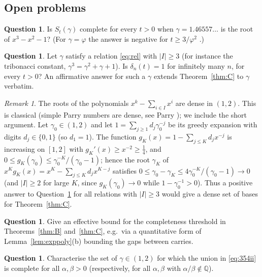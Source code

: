 \documentclass[11pt]{amsart}
\theoremstyle{definition}
\newtheorem{question}[lemma]{Question}
\theoremstyle{remark}
\newtheorem{remark}[lemma]{Remark}
\newcommand{\Q}{\mathbb{Q}}
\begin{document}
\subsection{Open problems}
\begin{question}
Is $S_t(\gamma)$ complete for every $t>0$ when $\gamma=1.46557\ldots$ is the root of
$x^3-x^2-1$? (For $\gamma=\varphi$ the answer is negative for $t\ge3/\varphi^2$ \cite{vD26}.)
\end{question}

\begin{question}\label{q:units}
Let $\gamma$ satisfy a relation \eqref{eq:rel} with $|I|\ge3$ (for instance the tribonacci
constant, $\gamma^3=\gamma^2+\gamma+1$). Is $\delta_n(t)=1$ for infinitely many $n$, for every
$t>0$? An affirmative answer for such a $\gamma$ extends Theorem~\ref{thm:C} to $\gamma$ verbatim.
\end{question}

\begin{remark}
The roots of the polynomials $x^k-\sum_{i\in I}x^i$ are dense in $(1,2)$. This is classical
(simple Parry numbers are dense, see Parry \cite{Par60}); we include the short argument. Let
$\gamma_0\in(1,2)$ and let $1=\sum_{j\ge1}d_j\gamma_0^{-j}$ be its greedy expansion with digits
$d_j\in\{0,1\}$ (so $d_1=1$). The function $g_K(x)=1-\sum_{j\le K}d_jx^{-j}$ is increasing on
$[1,2]$ with $g_K'(x)\ge x^{-2}\ge\frac14$, and $0\le g_K(\gamma_0)\le\gamma_0^{-K}/(\gamma_0-1)$;
hence the root $\gamma_K$ of $x^Kg_K(x)=x^K-\sum_{j\le K}d_jx^{K-j}$ satisfies
$0\le\gamma_0-\gamma_K\le4\gamma_0^{-K}/(\gamma_0-1)\to0$ (and $|I|\ge2$ for large $K$, since
$g_K(\gamma_0)\to0$ while $1-\gamma_0^{-1}>0$). Thus a positive answer to
Question~\ref{q:units} for all relations with $|I|\ge3$ would give a dense set of bases for
Theorem~\ref{thm:C}.
\end{remark}

\begin{question}
Give an effective bound for the completeness threshold in Theorems~\ref{thm:B}
and~\ref{thm:C}, e.g.\ via a quantitative form of Lemma~\ref{lem:exppoly}(b) bounding the
gaps between carries.
\end{question}

\begin{question}
Characterise the set of $\gamma\in(1,2)$ for which the union in \eqref{eq:354ii} is complete
for all $\alpha,\beta>0$ (respectively, for all $\alpha,\beta$ with $\alpha/\beta\notin\Q$).
\end{question}
\end{document}
